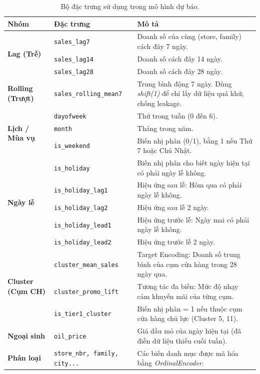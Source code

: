 \documentclass[12pt,a4paper]{report}
\begin{document}
\begin{table}[H]
    \centering
    \caption{Bộ đặc trưng sử dụng trong mô hình dự báo.}
    \label{tab:feature_engineering}
    \renewcommand{\arraystretch}{1.3} %
    \begin{tabular}{|l|l|p{7cm}|}
        \hline
        \textbf{Nhóm} & \textbf{Đặc trưng} & \textbf{Mô tả} \\
        \hline
        \multirow{3}{*}{\textbf{Lag (Trễ)}} 
        & \texttt{sales\_lag7} & Doanh số của cùng (store, family) cách đây 7 ngày. \\
        \cline{2-3}
        & \texttt{sales\_lag14} & Doanh số cách đây 14 ngày. \\
        \cline{2-3}
        & \texttt{sales\_lag28} & Doanh số cách đây 28 ngày. \\
        \hline
        \textbf{Rolling (Trượt)} 
        & \texttt{sales\_rolling\_mean7} & Trung bình động 7 ngày. Dùng \textit{shift(1)} để chỉ lấy dữ liệu quá khứ, chống leakage. \\
        \hline
        \multirow{3}{*}{\textbf{Lịch / Mùa vụ}} 
        & \texttt{dayofweek} & Thứ trong tuần (0 đến 6). \\
        \cline{2-3}
        & \texttt{month} & Tháng trong năm. \\
        \cline{2-3}
        & \texttt{is\_weekend} & Biến nhị phân (0/1), bằng 1 nếu Thứ 7 hoặc Chủ Nhật. \\
        \hline
        \multirow{5}{*}{\textbf{Ngày lễ}} 
        & \texttt{is\_holiday} & Biến nhị phân cho biết ngày hiện tại có phải ngày lễ không. \\
        \cline{2-3}
        & \texttt{is\_holiday\_lag1} & Hiệu ứng sau lễ: Hôm qua có phải ngày lễ không. \\
        \cline{2-3}
        & \texttt{is\_holiday\_lag2} & Hiệu ứng sau lễ 2 ngày. \\
        \cline{2-3}
        & \texttt{is\_holiday\_lead1} & Hiệu ứng trước lễ: Ngày mai có phải ngày lễ không. \\
        \cline{2-3}
        & \texttt{is\_holiday\_lead2} & Hiệu ứng trước lễ 2 ngày. \\
        \hline
        \multirow{3}{*}{\textbf{Cluster (Cụm CH)}} 
        & \texttt{cluster\_mean\_sales} & Target Encoding: Doanh số trung bình của cụm cửa hàng trong 28 ngày qua. \\
        \cline{2-3}
        & \texttt{cluster\_promo\_lift} & Tương tác đa biến: Mức độ nhạy cảm khuyến mãi của từng cụm. \\
        \cline{2-3}
        & \texttt{is\_tier1\_cluster} & Biến nhị phân = 1 nếu thuộc cụm cửa hàng chủ lực (Cluster 5, 11). \\
        \hline
        \textbf{Ngoại sinh} 
        & \texttt{oil\_price} & Giá dầu mỏ của ngày hiện tại (đã điền dữ liệu thiếu cuối tuần). \\
        \hline
        \textbf{Phân loại} 
        & \texttt{store\_nbr, family, city...} & Các biến danh mục được mã hóa bằng \textit{OrdinalEncoder}. \\
        \hline
    \end{tabular}
\end{table}
\end{document}
